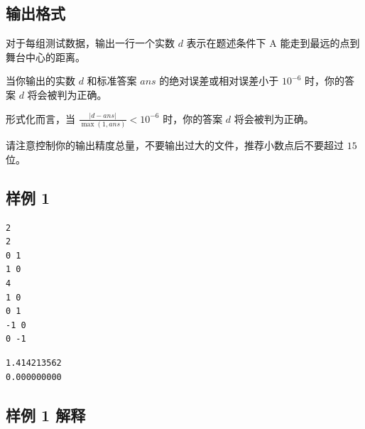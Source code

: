 \subsection{输出格式}

对于每组测试数据，输出一行一个实数 $d$ 表示在题述条件下 A 能走到最远的点到舞台中心的距离。

当你输出的实数 $d$ 和标准答案 $ans$ 的绝对误差或相对误差小于 $10^{-6}$ 时，你的答案 $d$ 将会被判为正确。

形式化而言，当 $\frac{|d - ans|}{\max(1, ans)} < 10^{-6}$ 时，你的答案 $d$ 将会被判为正确。

请注意控制你的输出精度总量，不要输出过大的文件，推荐小数点后不要超过 $15$ 位。

\subsection{样例 1}

\begin{minipage}{\linewidth}
	\begin{minipage}[t]{0.49\linewidth}
		\begin{lstlisting}[title=\texttt{standard input}]
2
2
0 1
1 0
4
1 0
0 1
-1 0
0 -1
\end{lstlisting}
	\end{minipage}
	\begin{minipage}[t]{0.49\linewidth}
		\begin{lstlisting}[title=\texttt{standard output}]
1.414213562
0.000000000
\end{lstlisting}
	\end{minipage}
\end{minipage}

\newpage

\subsection{样例 1 解释}


